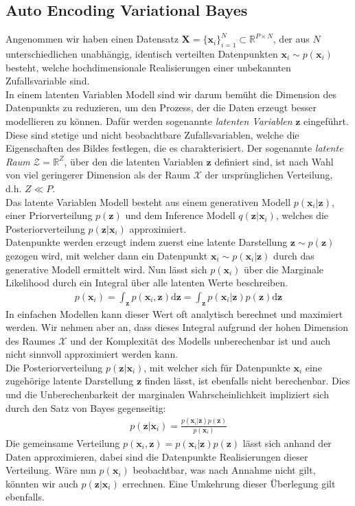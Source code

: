 \documentclass[12pt]{article}
\newcommand{\R}{\mathbb{R}}
\newcommand{\z}{\mathbf{z}}
\newcommand{\x}{\mathbf{x}_i}
\begin{document}
	\subsection[Auto Encoding Variational Bayes]{Auto Encoding Variational Bayes}
	Angenommen wir haben einen Datensatz $\textbf{X} = \lbrace\x \rbrace_{i=1}^{N} \subset \R^{P\times N}$, der aus $N$ unterschiedlichen unabhängig, identisch verteilten Datenpunkten $\x\sim p(\x)$ besteht, welche hochdimensionale Realisierungen einer unbekannten Zufallsvariable sind.\\
	In einem latenten Variablen Modell sind wir darum bemüht die Dimension des Datenpunkts zu reduzieren, um den Prozess, der die Daten erzeugt besser modellieren zu können.
	Dafür werden sogenannte \emph{latenten Variablen} $\z$ eingeführt. Diese sind stetige und nicht beobachtbare Zufallsvariablen, welche die Eigenschaften des Bildes festlegen, die es charakterisiert.
	Der sogenannte \emph{latente Raum} $\mathcal{Z} = \R^Z$, über den die latenten Variablen $\z$ definiert sind, ist nach Wahl von viel geringerer Dimension als der Raum $\mathcal{X}$ der ursprünglichen Verteilung, d.h. $Z \ll P$.\\
	Das latente Variablen Modell besteht aus einem generativen Modell $p(\x|\z)$, einer Priorverteilung $p(\z)$ und dem Inference Modell $q(\z|\x)$, welches die Posteriorverteilung $p(\z|\x)$ approximiert.\\
	Datenpunkte werden erzeugt indem zuerst eine latente Darstellung $\z \sim  p(\z)$  gezogen wird, mit welcher dann ein Datenpunkt  $\x \sim  p(\x|\z)$ durch das generative Modell ermittelt wird. Nun lässt sich $p(\x)$ über die Marginale Likelihood durch ein Integral über alle latenten Werte beschreiben.
	\begin{align*}
	p(\x)= \int_{\z} p(\x,\z) \mathrm{d}\textbf{z} = \int_{\z} p(\x|\z)p(\z) \mathrm{d}\z
	\end{align*}
	In einfachen Modellen kann dieser Wert oft analytisch berechnet und maximiert werden.
	Wir nehmen aber an, dass dieses Integral aufgrund der hohen Dimension des Raumes $\mathcal{X}$ und der Komplexität des Modells unberechenbar ist und auch nicht sinnvoll approximiert werden kann.\\
	Die Posteriorverteilung $p(\z|\x)$, mit welcher sich für Datenpunkte $\x$ eine zugehörige latente Darstellung $\z$ finden lässt, ist ebenfalls nicht berechenbar. Dies und die Unberechenbarkeit der marginalen Wahrscheinlichkeit impliziert sich durch den Satz von Bayes gegenseitig:
	\begin{align*}
	p(\z|\x)= \frac{p(\x|\z)p(\z)}{p(\x)}
	\end{align*}
	Die gemeinsame Verteilung $p(\x,\z) = p(\x|\z)p(\z)$ lässt sich anhand der Daten approximieren, dabei sind die Datenpunkte Realisierungen dieser Verteilung. Wäre nun $p(\x)$ beobachtbar, was nach Annahme nicht gilt, könnten wir auch $p(\z|\x)$ errechnen. Eine Umkehrung dieser Überlegung gilt ebenfalls. \\
\end{document}
